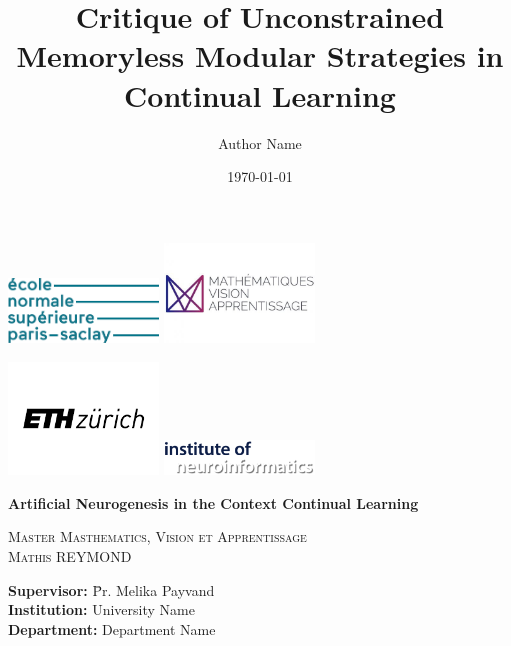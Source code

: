 \documentclass[twocolumn]{article}
\title{Critique of Unconstrained Memoryless Modular Strategies in Continual Learning}
\author{Author Name}
\date{\today}
\begin{document}
\begin{titlepage}
    \centering
    \includegraphics[width=0.3\textwidth]{images/logo_ENS.png} \hfill %
    \includegraphics[width=0.3\textwidth]{images/logo_MVA.png} \hfill %
    \vspace{1cm}
    
    \includegraphics[width=0.3\textwidth]{images/logo_ETH.png} \hfill %
    \includegraphics[width=0.3\textwidth]{images/logo_INI.png} \hfill %
    \vfill
    
    {\huge \bfseries Artificial Neurogenesis in the Context Continual Learning \\[0.4cm]} %
    
    \textsc{\LARGE Master Masthematics, Vision et Apprentissage}\\[1.5cm] %
    
    \textsc{\Large Mathis REYMOND}\\[0.5cm] %
    
    \vfill
    
    \Large
    \begin{tabbing}
        \hspace{4cm} \= \textbf{Supervisor:} \hspace{1cm} \= Pr. Melika Payvand \\ %
        \hspace{4cm} \= \textbf{Institution:} \> University Name \\ %
        \hspace{4cm} \= \textbf{Department:} \> Department Name \\ %
    \end{tabbing}
    

\end{titlepage}
\end{document}
